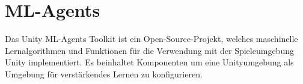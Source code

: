 \section{ML-Agents}
\label{sec:mlagents}
Das Unity ML-Agents Toolkit ist ein Open-Source-Projekt, welches maschinelle Lernalgorithmen und Funktionen für die Verwendung mit der Spieleumgebung Unity implementiert. Es beinhaltet Komponenten um eine Unityumgebung als Umgebung für verstärkendes Lernen zu konfigurieren.\cite{juliani2020}



